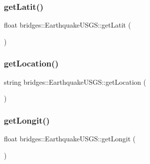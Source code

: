 \subsubsection{\texorpdfstring{get\+Latit()}{getLatit()}}
{\footnotesize\ttfamily float bridges\+::\+Earthquake\+U\+S\+G\+S\+::get\+Latit (\begin{DoxyParamCaption}{ }\end{DoxyParamCaption})\hspace{0.3cm}{\ttfamily [inline]}}

\hypertarget{classbridges_1_1_earthquake_u_s_g_s_aa04c172c5c77bd2f88b1dd319130b9eb}{}\label{classbridges_1_1_earthquake_u_s_g_s_aa04c172c5c77bd2f88b1dd319130b9eb} 
\subsubsection{\texorpdfstring{get\+Location()}{getLocation()}}
{\footnotesize\ttfamily string bridges\+::\+Earthquake\+U\+S\+G\+S\+::get\+Location (\begin{DoxyParamCaption}{ }\end{DoxyParamCaption})\hspace{0.3cm}{\ttfamily [inline]}}

\hypertarget{classbridges_1_1_earthquake_u_s_g_s_a63c2fed8b27dace2b988dd9c0c937d70}{}\label{classbridges_1_1_earthquake_u_s_g_s_a63c2fed8b27dace2b988dd9c0c937d70} 
\subsubsection{\texorpdfstring{get\+Longit()}{getLongit()}}
{\footnotesize\ttfamily float bridges\+::\+Earthquake\+U\+S\+G\+S\+::get\+Longit (\begin{DoxyParamCaption}{ }\end{DoxyParamCaption})\hspace{0.3cm}{\ttfamily [inline]}}

\hypertarget{classbridges_1_1_earthquake_u_s_g_s_a51659fac2236aaaa03d2921fd7c1fcf9}{}\label{classbridges_1_1_earthquake_u_s_g_s_a51659fac2236aaaa03d2921fd7c1fcf9} 
